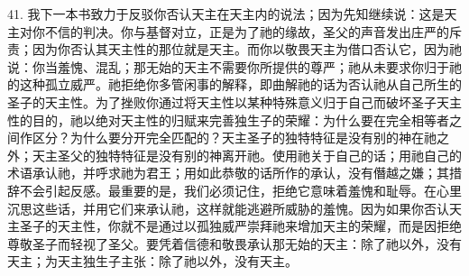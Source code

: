 41. 我下一本书致力于反驳你否认天主在天主内的说法；因为先知继续说：这是天主对你不信的判决。你与基督对立，正是为了祂的缘故，圣父的声音发出庄严的斥责；因为你否认其天主性的那位就是天主。而你以敬畏天主为借口否认它，因为祂说：你当羞愧、混乱；那无始的天主不需要你所提供的尊严；祂从未要求你归于祂的这种孤立威严。祂拒绝你多管闲事的解释，即曲解祂的话为否认祂从自己所生的圣子的天主性。为了挫败你通过将天主性以某种特殊意义归于自己而破坏圣子天主性的目的，祂以绝对天主性的归赋来完善独生子的荣耀：为什么要在完全相等者之间作区分？为什么要分开完全匹配的？天主圣子的独特特征是没有别的神在祂之外；天主圣父的独特特征是没有别的神离开祂。使用祂关于自己的话；用祂自己的术语承认祂，并呼求祂为君王；用如此恭敬的话所作的承认，没有僭越之嫌；其措辞不会引起反感。最重要的是，我们必须记住，拒绝它意味着羞愧和耻辱。在心里沉思这些话，并用它们来承认祂，这样就能逃避所威胁的羞愧。因为如果你否认天主圣子的天主性，你就不是通过以孤独威严崇拜祂来增加天主的荣耀，而是因拒绝尊敬圣子而轻视了圣父。要凭着信德和敬畏承认那无始的天主：除了祂以外，没有天主；为天主独生子主张：除了祂以外，没有天主。\par

